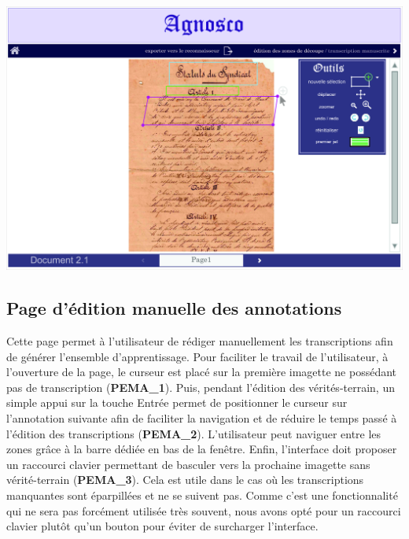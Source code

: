 \begin{mdframed}[frametitle={Figure 7 : Édition des zones de découpe}, innerbottommargin=10]
\begin{center}
\includegraphics[scale=0.05]{ihm2.jpg}
\end{center}
\end{mdframed}

\subsection{Page d'édition manuelle des annotations}

Cette page permet à l’utilisateur de rédiger manuellement les transcriptions
afin de générer l’ensemble d’apprentissage. Pour faciliter le travail de
l’utilisateur, à l’ouverture de la page, le curseur est placé sur la première
imagette ne possédant pas de transcription (\textbf{PEMA\_1}). Puis, pendant
l’édition des vérités-terrain, un simple appui sur la touche Entrée permet de
positionner le curseur sur l’annotation suivante afin de faciliter la
navigation et de réduire le temps passé à l’édition des transcriptions
(\textbf{PEMA\_2}). L’utilisateur peut naviguer entre les zones grâce à 
la barre dédiée en bas de la fenêtre. Enfin, l’interface doit proposer un raccourci clavier
permettant de basculer vers la prochaine imagette sans vérité-terrain
(\textbf{PEMA\_3}). Cela est utile dans le cas où les transcriptions manquantes
sont éparpillées et ne se suivent pas. Comme c’est une fonctionnalité qui ne
sera pas forcément utilisée très souvent, nous avons opté pour un raccourci
clavier plutôt qu’un bouton pour éviter de surcharger l’interface.

